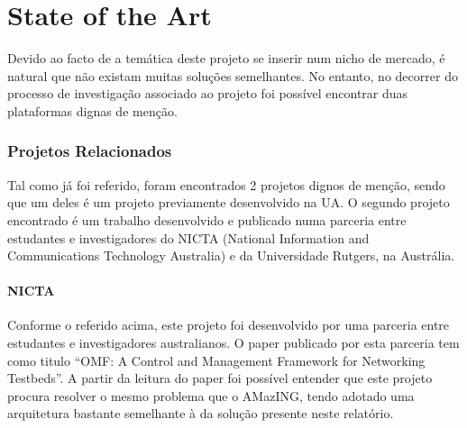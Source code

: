 \chapter{State of the Art}
Devido ao facto de a temática deste projeto se inserir num nicho de mercado, é natural que não existam muitas soluções semelhantes. No entanto, no decorrer do processo de investigação associado ao projeto foi possível encontrar duas plataformas dignas de menção.

\subsection{Projetos Relacionados}
Tal como já foi referido, foram encontrados 2 projetos dignos de menção, sendo que um deles é um projeto previamente desenvolvido na UA. O segundo projeto encontrado é um trabalho desenvolvido e publicado numa parceria entre estudantes e investigadores do NICTA (National Information and Communications Technology Australia) e da Universidade Rutgers, na Austrália.

\subsubsection{NICTA}
Conforme o referido acima, este projeto foi desenvolvido por uma parceria entre estudantes e investigadores australianos. O paper publicado por esta parceria tem como titulo “OMF: A Control and Management Framework for Networking Testbeds”. A partir da leitura do paper foi possível entender que este projeto procura resolver o mesmo problema que o AMazING, tendo adotado uma arquitetura bastante semelhante à da solução presente neste relatório.

